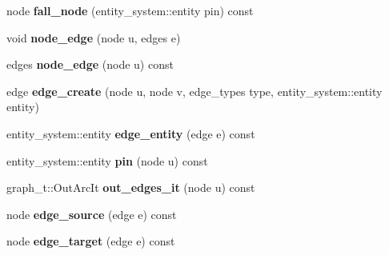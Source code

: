 \begin{DoxyCompactItemize}
\item 
\hypertarget{classophidian_1_1timing_1_1graph_adcb945787430859915155c5ff09babe3}{node {\bfseries fall\-\_\-node} (entity\-\_\-system\-::entity pin) const }\label{classophidian_1_1timing_1_1graph_adcb945787430859915155c5ff09babe3}

\item 
\hypertarget{classophidian_1_1timing_1_1graph_adb6649886b1534f8f37da853146d9dcc}{void {\bfseries node\-\_\-edge} (node u, edges e)}\label{classophidian_1_1timing_1_1graph_adb6649886b1534f8f37da853146d9dcc}

\item 
\hypertarget{classophidian_1_1timing_1_1graph_a54fece1d8df17f0f6495728b18c7cc95}{edges {\bfseries node\-\_\-edge} (node u) const }\label{classophidian_1_1timing_1_1graph_a54fece1d8df17f0f6495728b18c7cc95}

\item 
\hypertarget{classophidian_1_1timing_1_1graph_aca7f38d0cc23c2b3d8350e27a905ce1c}{edge {\bfseries edge\-\_\-create} (node u, node v, edge\-\_\-types type, entity\-\_\-system\-::entity entity)}\label{classophidian_1_1timing_1_1graph_aca7f38d0cc23c2b3d8350e27a905ce1c}

\item 
\hypertarget{classophidian_1_1timing_1_1graph_a14810a064bff1349c900af0c2d0cc9d4}{entity\-\_\-system\-::entity {\bfseries edge\-\_\-entity} (edge e) const }\label{classophidian_1_1timing_1_1graph_a14810a064bff1349c900af0c2d0cc9d4}

\item 
\hypertarget{classophidian_1_1timing_1_1graph_a159825b15d9373bd3a9bb60520615ebd}{entity\-\_\-system\-::entity {\bfseries pin} (node u) const }\label{classophidian_1_1timing_1_1graph_a159825b15d9373bd3a9bb60520615ebd}

\item 
\hypertarget{classophidian_1_1timing_1_1graph_a6846d4dab8ed6f26c3ac47375c30aaf8}{graph\-\_\-t\-::\-Out\-Arc\-It {\bfseries out\-\_\-edges\-\_\-it} (node u) const }\label{classophidian_1_1timing_1_1graph_a6846d4dab8ed6f26c3ac47375c30aaf8}

\item 
\hypertarget{classophidian_1_1timing_1_1graph_a2c64a71a3747ea6fceb44eb96eb4f250}{node {\bfseries edge\-\_\-source} (edge e) const }\label{classophidian_1_1timing_1_1graph_a2c64a71a3747ea6fceb44eb96eb4f250}

\item 
\hypertarget{classophidian_1_1timing_1_1graph_a8f589ce4f52217cd65d0a5885da649de}{node {\bfseries edge\-\_\-target} (edge e) const }\label{classophidian_1_1timing_1_1graph_a8f589ce4f52217cd65d0a5885da649de}


\end{DoxyCompactItemize}

